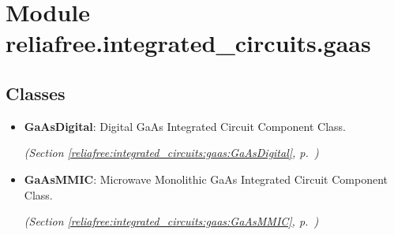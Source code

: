 %
%
%


\section{Module reliafree.integrated\_circuits.gaas}

    \label{reliafree:integrated_circuits:gaas}


\subsection{Classes}

\begin{itemize}  \setlength{\parskip}{0ex}
  \item \textbf{GaAsDigital}: Digital GaAs Integrated Circuit Component Class.



  \textit{(Section \ref{reliafree:integrated_circuits:gaas:GaAsDigital}, p.~\pageref{reliafree:integrated_circuits:gaas:GaAsDigital})}

  \item \textbf{GaAsMMIC}: Microwave Monolithic GaAs Integrated Circuit Component Class.



  \textit{(Section \ref{reliafree:integrated_circuits:gaas:GaAsMMIC}, p.~\pageref{reliafree:integrated_circuits:gaas:GaAsMMIC})}

\end{itemize}


